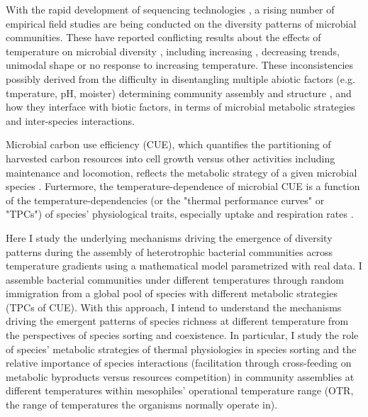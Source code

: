 \documentclass[11pt, a4paper]{article}
\begin{document}
\begin{spacing}{1.5}
With the rapid development of sequencing technologies \citep{kirk2004methods, theron2000molecular, tiedje1999opening}, a rising number of empirical field studies are being conducted on the diversity patterns of microbial communities. These have reported conflicting results about the effects of temperature on microbial diversity \citep{hendershot2017consistently}, including increasing \citep{zhou2016temperature}, decreasing \citep{kolton2019impact} trends, unimodal shape \citep{thompson2017communal} or no response \citep{zhou2020meta} to increasing temperature. These inconsistencies possibly derived from the difficulty in disentangling multiple abiotic factors (e.g. tmperature, pH, moister) determining community assembly and structure \citep{rillig2019role}, and how they interface with biotic factors, in terms of microbial metabolic strategies and inter-species interactions.

Microbial carbon use efficiency (CUE), which quantifies the partitioning of harvested carbon resources into cell growth versus other activities including maintenance and locomotion, reflects the metabolic strategy of a given microbial species \citep{geyer2016microbial, manzoni2012environmental,allison2010soil,zheng2019growth}. Furtermore, the temperature-dependence of microbial CUE is a function of the temperature-dependencies (or the "thermal performance curves" or "TPCs") of species' physiological traits, especially uptake and respiration rates  \citep{smith2020systematic, qiao2019global}. 

Here I  study the underlying mechanisms driving the emergence of diversity patterns during the assembly of heterotrophic bacterial communities across temperature gradients using a mathematical model parametrized with real data. I assemble bacterial communities under different temperatures through random immigration from a global pool of species with different metabolic strategies (TPCs of CUE). With this approach, I intend to understand the mechanisms driving the emergent patterns of species richness at different temperature from the perspectives of species sorting and coexistence. In particular, I study the role of species' metabolic strategies of thermal physiologies in species sorting and the relative importance of species interactions (facilitation through cross-feeding on metabolic byproducts versus resources competition) in community assemblies at different temperatures within mesophiles' operational temperature range (OTR, the range of temperatures the organisms normally operate in).


\end{spacing}
\end{document}
